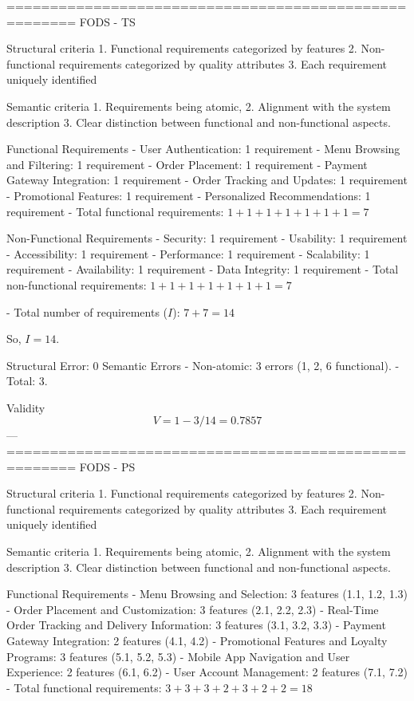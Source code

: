 ======================================================
FODS - TS

Structural criteria 
1. Functional requirements categorized by features
2. Non-functional requirements categorized by quality attributes
3. Each requirement uniquely identified

Semantic criteria
1. Requirements being atomic, 
2. Alignment with the system description
3. Clear distinction between functional and non-functional aspects. 

Functional Requirements
- User Authentication: 1 requirement
- Menu Browsing and Filtering: 1 requirement
- Order Placement: 1 requirement
- Payment Gateway Integration: 1 requirement
- Order Tracking and Updates: 1 requirement
- Promotional Features: 1 requirement
- Personalized Recommendations: 1 requirement
- Total functional requirements: \( 1 + 1 + 1 + 1 + 1 + 1 + 1 = 7 \)

Non-Functional Requirements
- Security: 1 requirement
- Usability: 1 requirement
- Accessibility: 1 requirement
- Performance: 1 requirement
- Scalability: 1 requirement
- Availability: 1 requirement
- Data Integrity: 1 requirement
- Total non-functional requirements: \( 1 + 1 + 1 + 1 + 1 + 1 + 1 = 7 \)

- Total number of requirements (\( I \)): \( 7 + 7 = 14 \)

So, \( I = 14 \).

Structural Error: 0
Semantic Errors 
- Non-atomic: 3 errors (1, 2, 6 functional).
- Total: \(3\).

Validity
\[
V = 1 - 3/14 = 0.7857
\]
---
======================================================
FODS - PS

Structural criteria 
1. Functional requirements categorized by features
2. Non-functional requirements categorized by quality attributes
3. Each requirement uniquely identified

Semantic criteria
1. Requirements being atomic, 
2. Alignment with the system description
3. Clear distinction between functional and non-functional aspects. 

Functional Requirements
- Menu Browsing and Selection: 3 features (1.1, 1.2, 1.3)
- Order Placement and Customization: 3 features (2.1, 2.2, 2.3)
- Real-Time Order Tracking and Delivery Information: 3 features (3.1, 3.2, 3.3)
- Payment Gateway Integration: 2 features (4.1, 4.2)
- Promotional Features and Loyalty Programs: 3 features (5.1, 5.2, 5.3)
- Mobile App Navigation and User Experience: 2 features (6.1, 6.2)
- User Account Management: 2 features (7.1, 7.2)
- Total functional requirements: \( 3 + 3 + 3 + 2 + 3 + 2 + 2 = 18 \)

